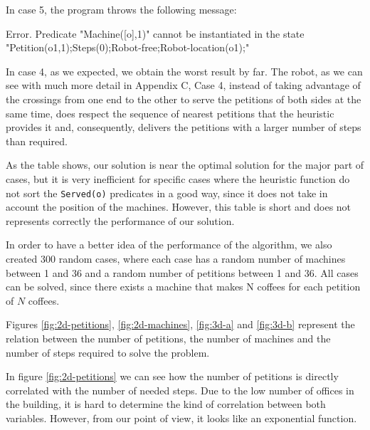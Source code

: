 \documentclass[12pt,a4paper,oneside]{article}
\numberwithin{equation}{section}
\numberwithin{equation}{section}
\theoremstyle{definition}
\begin{document}
\newcommand{\plottwodee}[1]{
	\begin{tikzpicture}
		\begin{axis}[
				xlabel={#1},
				ylabel=Steps,
			]
			\addplot[
				scatter,
				only marks,
			]
			table[
				x=#1,
				y=Steps,
				col sep=comma,
			]{results.csv};
		\end{axis}		
	\end{tikzpicture}
}

In case 5, the program throws the following message:
\begin{listing}[style=consola, numbers=none]
Error. Predicate "Machine([o],1)" cannot be instantiated in the state "Petition(o1,1);Steps(0);Robot-free;Robot-location(o1);"
\end{listing}

In case 4, as we expected, we obtain the worst result by far. The robot, as we can see with much more detail in Appendix C, Case 4, instead of taking advantage of the crossings from one end to the other to serve the petitions of both sides at the same time, does respect the sequence of nearest petitions that the heuristic provides it and, consequently, delivers the petitions with a larger number of steps than required.


As the table shows, our solution is near the optimal solution for the major part of cases, but it is very inefficient for specific cases where the heuristic function do not sort the \texttt{Served(o)} predicates in a good way, since it does not take in account the position of the machines. However, this table is short and does not represents correctly the performance of our solution.


In order to have a better idea of the performance of the algorithm, we also created 300 random cases, where each case has a random number of machines between 1 and 36 and a random number of petitions between 1 and 36. All cases can be solved, since there exists a machine that makes N coffees for each petition of $N$ coffees.

Figures \ref{fig:2d-petitions}, \ref{fig:2d-machines}, \ref{fig:3d-a} and \ref{fig:3d-b} represent the relation between the number of petitions, the number of machines and the number of steps required to solve the problem.

In figure \ref{fig:2d-petitions} we can see how the number of petitions is directly correlated with the number of needed steps. Due to the low number of offices in the building, it is hard to determine the kind of correlation between both variables. However, from our point of view, it looks like an exponential function.
	
\end{document}
